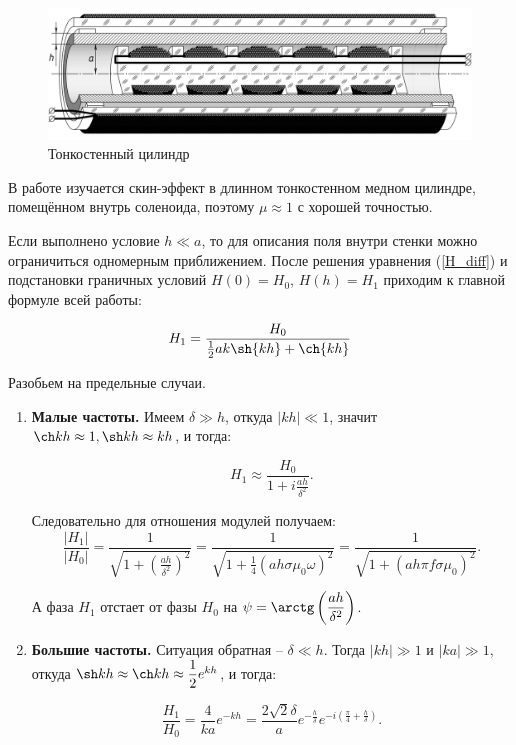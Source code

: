 	\begin{figure}[h!]
		\centering
		\includegraphics[scale=0.6]{images/Skin2.png}
		\caption{Тонкостенный цилиндр}
	\end{figure}
	
	В работе изучается скин-эффект в длинном тонкостенном медном цилиндре, помещённом внутрь соленоида, поэтому $\mu \approx 1$ с хорошей точностью.
	
	Если выполнено условие $h \ll a$, то для описания поля внутри стенки можно ограничиться одномерным приближением. После решения уравнения (\ref{H_diff}) и подстановки граничных условий $H(0) = H_0$, $H(h) = H_1$ приходим к главной формуле всей работы:
	
	\begin{equation}
		H_{1} = \dfrac{H_0}{\frac{1}{2}ak \sh{k h} + \ch{k h}}
	\end{equation}

	Разобьем на предельные случаи.
	
	\begin{enumerate}
		\item \textbf{Малые частоты.}
			Имеем $\delta \gg h$, откуда $|kh| \ll 1$, значит $\ch kh \approx 1, \sh kh \approx kh$, и тогда:
			
			\begin{equation}
				H_1 \approx \dfrac{H_0}{1 + i\frac{ah}{\delta^2}}.
			\end{equation}
		
			Следовательно для отношения модулей получаем:
			\begin{equation}
				\dfrac{|H_1|}{|H_0|} = \dfrac{1}{\sqrt{1+ \left(\frac{ah}{\delta^2}\right)^2}} = \dfrac{1}{\sqrt{1 + \frac{1}{4}\left(ah\sigma\mu_0\omega\right)^2}} = \dfrac{1}{\sqrt{1 + \left(ah\pi f\sigma\mu_0\right)^2}}.
			\end{equation}
		
		 	А фаза $H_1$ отстает от фазы $H_0$ на $\psi = \arctg\left(\dfrac{ah}{\delta^2}\right)$.
		 	
		 \item \textbf{Большие частоты.} 
		 	Ситуация обратная -- $\delta \ll h$. Тогда $|kh| \gg 1$ и 	$|ka| \gg 1$, откуда $\sh kh \approx \ch kh \approx \dfrac{1}{2}e^{kh}$, и тогда:
		 
		 	\Large
			\begin{equation}
			 	\frac{H_1}{H_0} = \frac{4}{ka}e^{-kh} = \frac{2\sqrt{2}\delta}{a}e^{-\frac{h}{\delta}}e^{-i\left(\frac{\pi}{4} + \frac{h}{\delta}\right)}.
			 	\label{high}
			\end{equation}
	\end{enumerate}
	
